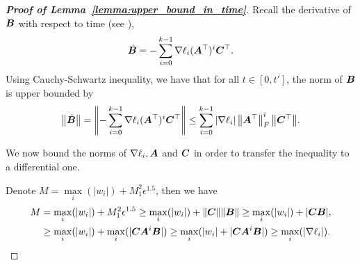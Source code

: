 \begin{proof}[\textbf{Proof of Lemma~\ref{lemma:upper_bound_in_time}}]
Recall the derivative of ${\bm{B}}$ with respect to time (see ),
\begin{equation}
    \dot{{\bm{B}}} = -\sum_{i=0}^{k-1} \nabla \ell_i ({\bm{A}}^\top)^i {\bm{C}}^\top.
\end{equation}
%
Using Cauchy-Schwartz inequality, we have that for all $t\in[0,t']$, the norm of ${\bm{B}}$ is upper bounded by
\begin{equation}
\label{eq:B_dot_CS_inequality1}
    \left\|\dot{{\bm{B}}}\right\| = \left\|-\sum_{i=0}^{k-1} \nabla \ell_i ({\bm{A}}^\top)^i {\bm{C}}^\top\right\| \leq \sum_{i=0}^{k-1} \left|\nabla \ell_i\right| \left\|{\bm{A}}^\top\right\|_F^i \big\|{\bm{C}}^\top\big\|.
\end{equation}

We now bound the norms of $\nabla\ell_i, {\bm{A}}$ and ${\bm{C}}$ in order to transfer the inequality to a differential one. 

Denote $M = \underset{i}{\max}(|w_i|)+M_1^2\epsilon^{1.5}$, then we have
\begin{align}
    M &= \underset{i}{\max}(|w_i|)+M_1^2\epsilon^{1.5} \geq \underset{i}{\max}(|w_i|)+\|{\bm{C}}\| \|{\bm{B}}\| \geq \underset{i}{\max}(|w_i|)+|{\bm{C}}{\bm{B}}|, \\ &\geq \underset{i}{\max}(|w_i|)+\underset{i}{\max}(|{\bm{C}}{\bm{A}}^i {\bm{B}}|) \geq \underset{i}{\max}(|w_i|+|{\bm{C}}{\bm{A}}^i {\bm{B}}|) \geq \underset{i}{\max}(|\nabla \ell_i|).
\end{align}


\end{proof}
